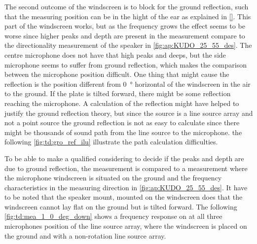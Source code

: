 The second outcome of the windscreen is to block for the ground reflection, such that the measuring position can be in the hight of the ear as explained in \autoref{}. This part of the windscreen works, but as the frequency grows the effect seems to be worse since higher peaks and depth are present in the measurement compare to the directionality measurement of the speaker in \autoref{fig:ap:KUDO_25_55_des}. The centre microphone does not have that high peaks and deeps, but the side microphone seems to suffer from ground reflection, which makes the comparison between the microphone position difficult. One thing that might cause the reflection is the position different from \SI{0}{\degree} horizontal of the windscreen in the air to the ground. If the plate is tilted forward, there might be some reflection reaching the microphone. A calculation of the reflection might have helped to justify the ground reflection theory, but since the source is a line source array and not a point source the ground reflection is not as easy to calculate since there might be thousands of sound path from the line source to the microphone. the following \autoref{fig:td:gro_ref_ilu} illustrate the path calculation difficulties. 



To be able to make a qualified considering to decide if the peaks and depth are due to ground reflection, the measurement is compared to a measurement where the microphone windscreen is situated on the ground and the frequency characteristics in the measuring direction in \autoref{fig:ap:KUDO_25_55_des}.  It have to be noted that the speaker mount, mounted on the windscreen does that the windscreen cannot lay flat on the ground but is tilted forward. The following \autoref{fig:td:mea_1_0_deg_down} shows a frequency response on at all three microphones position of the line source array, where the windscreen is placed on the ground and with a non-rotation line source array.


